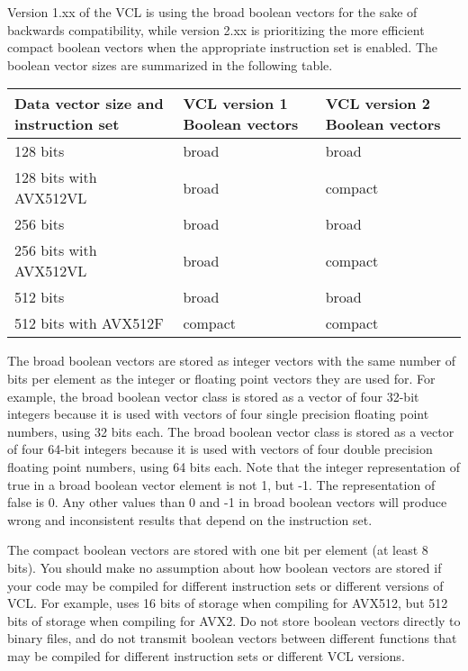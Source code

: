\documentclass[vcl_manual.tex]{subfiles}
\begin{document}
Version 1.xx of the VCL is using the broad boolean vectors for the sake of backwards compatibility, while version 2.xx is prioritizing the more efficient compact boolean vectors when the appropriate instruction set is enabled. The boolean vector sizes are summarized in the following table.

\label{tableBooleanVectorSizes}
\begin{tabular}{|p{50mm}|p{40mm}|p{40mm}|}
\hline
\bfseries Data vector size \newline and instruction set & \bfseries VCL version 1 \newline Boolean vectors & \bfseries VCL version 2 \newline Boolean vectors \\ \hline
128 bits & broad & broad  \\ \hline
128 bits with AVX512VL & broad & compact \\ \hline
256 bits & broad & broad  \\ \hline
256 bits with AVX512VL & broad & compact \\ \hline
512 bits & broad & broad  \\ \hline
512 bits with AVX512F & compact & compact \\ \hline
\end{tabular}

The broad boolean vectors are stored as integer vectors with the same number of bits per element as the integer or floating point vectors they are used for. For example, the broad boolean vector class  is stored as a vector of four 32-bit integers because it is used with vectors  of four single precision floating point numbers, using 32 bits each. The broad boolean vector class  is stored as a vector of four 64-bit integers because it is used with vectors  of four double precision floating point numbers, using 64 bits each. Note that the integer representation of true in a broad boolean vector element is not 1, but  -1. The representation of false is 0. Any other values than 0 and -1 in broad boolean vectors will produce wrong and inconsistent results that depend on the instruction set.

The compact boolean vectors are stored with one bit per element (at least 8 bits). 
You should make no assumption about how boolean vectors are stored if your code may be compiled for different instruction sets or different versions of VCL. For example,
 uses 16 bits of storage when compiling for AVX512, but 512 bits of storage when compiling for AVX2. Do not store boolean vectors directly to binary files, and do not transmit boolean vectors between different functions that may be compiled for different instruction sets or different VCL versions.
\end{document}
